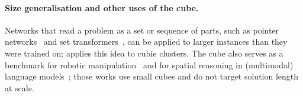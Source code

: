 \paragraph{Size generalisation and other uses of the cube.}
Networks that read a problem as a set or sequence of parts, such as pointer
networks~\cite{vinyals2015pointer} and set transformers~\cite{lee2019settransformer}, can be applied to larger
instances than they were trained on; \FiveA applies this idea to cubie clusters. The cube also serves as a
benchmark for robotic manipulation~\cite{openai2019dactyl} and for spatial reasoning in (multimodal) language
models~\cite{anand2025cubebench,gao2025cubebench}; those works use small cubes and do not target solution
length at scale.
